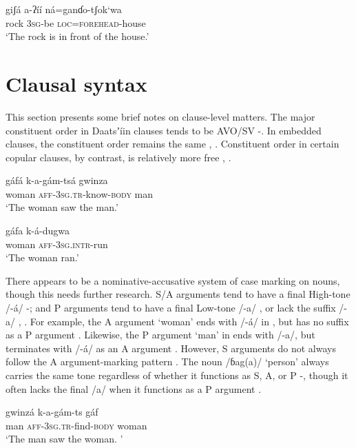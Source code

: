 \documentclass[output=paper]{langsci/langscibook}
\begin{document}
\ea\label{ex:ahlandc:65}
\gll
giʃá   a-ʔíí    ná=ganɗo-tʃok‘wa   \\ 
rock 3\textsc{sg}{}-be \textsc{loc}=\textsc{forehead}{}-house \\
\glt
‘The rock is in front of the house.’
\z

\section{Clausal syntax}\label{sec:ahlandc:11}

This section presents some brief notes on clause-level matters. The major constituent order in Daatsʼíin clauses tends to be AVO/SV -. In embedded clauses, the constituent order remains the same , . Constituent order in certain copular clauses, by contrast, is relatively more free , .

\ea\label{ex:ahlandc:66}
\gll
gáfá      k-a-gám-tsá    gwinza \\ 
woman \textsc{aff-3sg.tr}{}-know-\textsc{body}  man \\
\glt
‘The woman saw the man.’
\z

\ea\label{ex:ahlandc:67}
\gll
gáfa       k-á-dugwa \\
 woman \textsc{aff-3sg.intr}{}-run \\
\glt
‘The woman ran.’
\z

There appears to be a nominative-accusative system of case marking on nouns, though this needs further research. S/A arguments tend to have a final High-tone /-á/ -; and P arguments tend to have a final Low-tone /-a/ , or lack the suffix /-a/ , . For example, the A argument ‘woman’ ends with /-á/ in , but has no suffix as a P argument . Likewise, the P argument ‘man’ in  ends with /-a/, but terminates with /-á/ as an A argument . However, S arguments do not always follow the A argument-marking pattern . The noun /ɓag(a)/ ‘person’ always carries the same tone regardless of whether it functions as S, A, or P -, though it often lacks the final /a/ when it functions as a P argument . 

\ea\label{ex:ahlandc:68}
\gll
gwinzá  k-a-gám-ts   gáf  \\
man  \textsc{aff-3sg.tr}{}-find-\textsc{body}  woman \\
\glt
‘The man saw the woman. ’
\z
\end{document}
